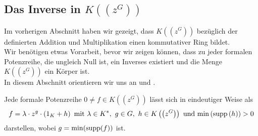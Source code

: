 \subsection{Das Inverse in $K\left(\left(z^{G}\right)\right)$ }
%
%
%
%
%
Im vorherigen Abschnitt haben wir gezeigt, dass $K\left(\left(z^{G}\right)\right)$ bezüglich der definierten Addition und Multiplikation einen kommutativer Ring bildet. \\
Wir benötigen etwas Vorarbeit, bevor wir zeigen können, dass zu jeder formalen Potenzreihe, die ungleich Null ist, ein Inverses existiert und die Menge  $K\left(\left(z^{G}\right)\right)$ ein Körper ist.\\
In diesem Abschnitt orientieren wir uns an \cite[S. 196- 198]{fuchs66} und \cite[S. 210- 213]{neumann49}.
% 
%
%
%
%
%
\begin{satz}\label{JedePotenzreihesoDarstellbar}
Jede formale Potenzreihe $0 \neq f \in K\left(\left(z^{G}\right)\right)$ lässt sich in eindeutiger Weise als  \\
\[f = \lambda\cdot z^g\cdot \left(1_K + h\right)\text{ mit } \lambda \in K^*, ~g \in G,~h \in K\left(\left(z^{G}\right)\right) \text{ und } \textup{min}\left(\textup{supp}\left(h\right)\right) > 0 \] darstellen, wobei $g= \min(\textup{supp}(f))$ ist.
\end{satz}
%
%

